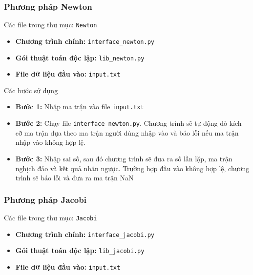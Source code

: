         \subsubsection{Phương pháp Newton}

            \par Các file trong thư mục: \texttt{Newton}
            \begin{itemize}
                \item \textbf{Chương trình chính:} \texttt{interface\_newton.py}
                \item \textbf{Gói thuật toán độc lập:} \texttt{lib\_newton.py}
                \item \textbf{File dữ liệu đầu vào:} \texttt{input.txt}
            \end{itemize}

            \par Các bước sử dụng
            \begin{itemize}
                \item \textbf{Bước 1:} Nhập ma trận vào file \texttt{input.txt}
                \item \textbf{Bước 2:} Chạy file \texttt{interface\_newton.py}. Chương trình sẽ tự động dò kích cỡ ma trận dựa theo ma trận người dùng nhập vào và báo lỗi nếu ma trận nhập vào không hợp lệ.
                \item \textbf{Bước 3:} Nhập sai số, sau đó chương trình sẽ đưa ra số lần lặp, ma trận nghịch đảo và kết quả nhân ngược. Trường hợp đầu vào không hợp lệ, chương trình sẽ báo lỗi và đưa ra ma trận NaN
            \end{itemize}

        \subsubsection{Phương pháp Jacobi}

            \par Các file trong thư mục: \texttt{Jacobi}
            \begin{itemize}
                \item \textbf{Chương trình chính:} \texttt{interface\_jacobi.py}
                \item \textbf{Gói thuật toán độc lập:} \texttt{lib\_jacobi.py}
                \item \textbf{File dữ liệu đầu vào:} \texttt{input.txt}
            \end{itemize}

